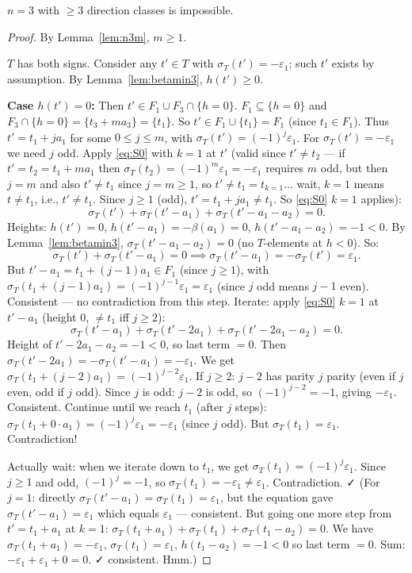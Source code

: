 \begin{lemma}[n3 contradiction]\label{lem:n3}
$n=3$ with $\geq 3$ direction classes is impossible.
\end{lemma}
\begin{proof}
By Lemma~\ref{lem:n3m}, $m \geq 1$.

$T$ has both signs. Consider any $t' \in T$ with $\sigma_T(t') = -\varepsilon_1$; such $t'$ exists by assumption. By Lemma~\ref{lem:betamin3}, $h(t') \geq 0$.

\textbf{Case $h(t') = 0$:} Then $t' \in F_1 \cup F_3 \cap \{h=0\}$. $F_1 \subseteq \{h=0\}$ and $F_3 \cap \{h=0\} = \{t_3 + m a_3\} = \{t_1\}$. So $t' \in F_1 \cup \{t_1\} = F_1$ (since $t_1 \in F_1$). Thus $t' = t_1 + j a_1$ for some $0 \leq j \leq m$, with $\sigma_T(t') = (-1)^j \varepsilon_1$. For $\sigma_T(t') = -\varepsilon_1$ we need $j$ odd. Apply \eqref{eq:S0} with $k=1$ at $t'$ (valid since $t' \neq t_2$ — if $t'=t_2=t_1+ma_1$ then $\sigma_T(t_2)=(-1)^m\varepsilon_1=-\varepsilon_1$ requires $m$ odd, but then $j=m$ and also $t' \neq t_1$ since $j=m \geq 1$, so $t' \neq t_1 = t_{k=1}$... wait, $k=1$ means $t \neq t_1$, i.e., $t' \neq t_1$. Since $j \geq 1$ (odd), $t' = t_1 + ja_1 \neq t_1$. So \eqref{eq:S0} $k=1$ applies):
\[
  \sigma_T(t') + \sigma_T(t'-a_1) + \sigma_T(t'-a_1-a_2) = 0.
\]
Heights: $h(t')=0$, $h(t'-a_1)=-\beta(a_1)=0$, $h(t'-a_1-a_2) = -1 < 0$. By Lemma~\ref{lem:betamin3}, $\sigma_T(t'-a_1-a_2)=0$ (no $T$-elements at $h<0$). So:
\[
  \sigma_T(t') + \sigma_T(t'-a_1) = 0 \implies \sigma_T(t'-a_1) = -\sigma_T(t') = \varepsilon_1.
\]
But $t'-a_1 = t_1 + (j-1)a_1 \in F_1$ (since $j \geq 1$), with $\sigma_T(t_1+(j-1)a_1) = (-1)^{j-1}\varepsilon_1 = \varepsilon_1$ (since $j$ odd means $j-1$ even). Consistent — no contradiction from this step. Iterate: apply \eqref{eq:S0} $k=1$ at $t'-a_1$ (height $0$, $\neq t_1$ iff $j \geq 2$):
\[
  \sigma_T(t'-a_1)+\sigma_T(t'-2a_1)+\sigma_T(t'-2a_1-a_2)=0.
\]
Height of $t'-2a_1-a_2 = -1 < 0$, so last term $=0$. Then $\sigma_T(t'-2a_1) = -\sigma_T(t'-a_1) = -\varepsilon_1$. We get $\sigma_T(t_1+(j-2)a_1) = (-1)^{j-2}\varepsilon_1$. If $j \geq 2$: $j-2$ has parity $j$ parity (even if $j$ even, odd if $j$ odd). Since $j$ is odd: $j-2$ is odd, so $(-1)^{j-2} = -1$, giving $-\varepsilon_1$. Consistent. Continue until we reach $t_1$ (after $j$ steps): $\sigma_T(t_1+0\cdot a_1) = (-1)^j\varepsilon_1 = -\varepsilon_1$ (since $j$ odd). But $\sigma_T(t_1) = \varepsilon_1$. Contradiction!

Actually wait: when we iterate down to $t_1$, we get $\sigma_T(t_1) = (-1)^j\varepsilon_1$. Since $j \geq 1$ and odd, $(-1)^j = -1$, so $\sigma_T(t_1) = -\varepsilon_1 \neq \varepsilon_1$. Contradiction. ✓ (For $j=1$: directly $\sigma_T(t'-a_1)=\sigma_T(t_1)=\varepsilon_1$, but the equation gave $\sigma_T(t'-a_1)=\varepsilon_1$ which equals $\varepsilon_1$ — consistent. But going one more step from $t'=t_1+a_1$ at $k=1$: $\sigma_T(t_1+a_1)+\sigma_T(t_1)+\sigma_T(t_1-a_2)=0$. We have $\sigma_T(t_1+a_1)=-\varepsilon_1$, $\sigma_T(t_1)=\varepsilon_1$, $h(t_1-a_2)=-1<0$ so last term $=0$. Sum: $-\varepsilon_1+\varepsilon_1+0=0$. ✓ consistent. Hmm.)


\end{proof}
